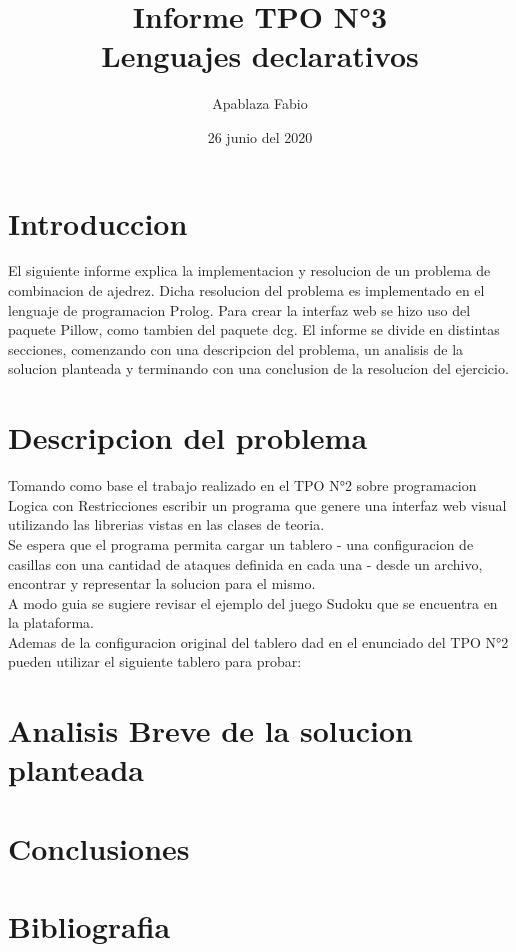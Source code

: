 \documentclass{article}
\title{\Huge\textbf{Informe TPO N°3} \\ Lenguajes declarativos}
\author{Apablaza Fabio}
\date{26 junio del 2020}
\begin{document}
\maketitle
\newpage


\section{Introduccion}
El siguiente informe explica la implementacion y resolucion de un problema de combinacion de ajedrez. Dicha resolucion del problema es implementado en el lenguaje de programacion Prolog. Para crear la interfaz web se hizo uso del paquete Pillow, como tambien del paquete dcg. El informe se divide en distintas secciones, comenzando con una descripcion del problema, un analisis de la solucion planteada y terminando con una conclusion de la resolucion del ejercicio.

\newpage

\section{Descripcion del problema}
\begin{Center}
Tomando como base el trabajo realizado en el TPO N°2 sobre programacion Logica con Restricciones escribir un programa que genere una interfaz web visual utilizando las librerias vistas en las clases de teoria.\\
Se espera que el programa permita cargar un tablero - una configuracion de casillas con una cantidad de ataques definida en cada una - desde un archivo, encontrar y representar la solucion para el mismo.\\
A modo guia se sugiere revisar el ejemplo del juego Sudoku que se encuentra en la plataforma.\\
Ademas de la configuracion original del tablero dad en el enunciado del TPO N°2 pueden utilizar el siguiente tablero para probar:\\

\end{Center}

\newpage
\section{Analisis Breve de la solucion planteada}

\newpage
\section{Conclusiones}

\newpage
\section{Bibliografia}
\end{document}
